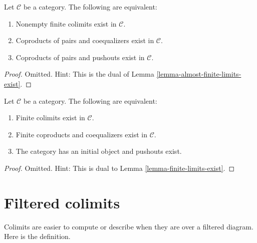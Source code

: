 \begin{lemma}
\label{lemma-almost-finite-colimits-exist}
Let $\mathcal{C}$ be a category.
The following are equivalent:
\begin{enumerate}
\item Nonempty finite colimits exist in $\mathcal{C}$.
\item Coproducts of pairs and coequalizers exist in $\mathcal{C}$.
\item Coproducts of pairs and pushouts exist in $\mathcal{C}$.
\end{enumerate}
\end{lemma}

\begin{proof}
Omitted. Hint: This is the dual of
Lemma \ref{lemma-almost-finite-limits-exist}.
\end{proof}

\begin{lemma}
\label{lemma-colimits-exist}
Let $\mathcal{C}$ be a category.
The following are equivalent:
\begin{enumerate}
\item Finite colimits exist in $\mathcal{C}$.
\item Finite coproducts and coequalizers exist in $\mathcal{C}$.
\item The category has an initial object and pushouts exist.
\end{enumerate}
\end{lemma}

\begin{proof}
Omitted. Hint: This is dual to Lemma \ref{lemma-finite-limits-exist}.
\end{proof}





\section{Filtered colimits}
\label{section-directed-colimits}

\noindent
Colimits are easier to compute or describe when they
are over a filtered diagram. Here is the definition.

